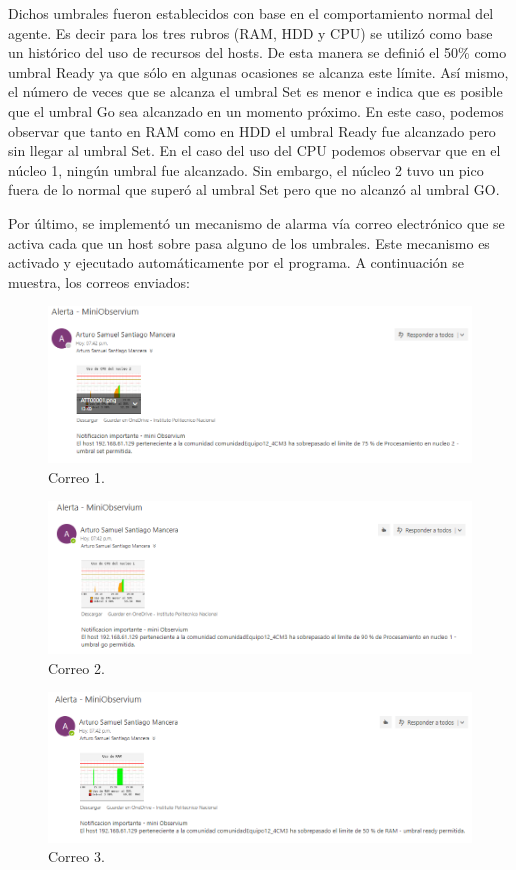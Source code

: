 Dichos umbrales fueron establecidos con base en el comportamiento normal del agente. Es decir para los tres rubros (RAM, HDD y CPU) se utilizó como base un histórico del uso de recursos del hosts. De esta manera se definió el 50\% como umbral Ready ya que sólo en algunas ocasiones se alcanza este límite. Así mismo, el número de veces que se alcanza el umbral Set es menor e indica que es posible que el umbral Go sea alcanzado en un momento próximo. En este caso, podemos observar que tanto en RAM como en HDD el umbral Ready fue alcanzado pero sin llegar al umbral Set. En el caso del uso del CPU podemos observar que en el núcleo 1, ningún umbral fue alcanzado. Sin embargo, el núcleo 2 tuvo un pico fuera de lo normal que superó al umbral Set pero que no alcanzó al umbral GO.

Por último, se implementó un mecanismo de alarma vía correo electrónico que se activa cada que un host sobre pasa alguno de los umbrales. Este mecanismo es activado y ejecutado automáticamente por el programa. A continuación se muestra, los correos enviados:

\FloatBarrier
\begin{figure}[htbp!]
		\centering
			\includegraphics[width=.9 \textwidth]{images/correo1}
		\caption{Correo 1.}
		\label{image:correo1}
\end{figure}
\FloatBarrier

\FloatBarrier
\begin{figure}[htbp!]
		\centering
			\includegraphics[width=.9 \textwidth]{images/correo2}
		\caption{Correo 2.}
		\label{image:correo2}
\end{figure}
\FloatBarrier

\FloatBarrier
\begin{figure}[htbp!]
		\centering
			\includegraphics[width=.9 \textwidth]{images/correo3}
		\caption{Correo 3.}
		\label{image:correo3}
\end{figure}
\FloatBarrier